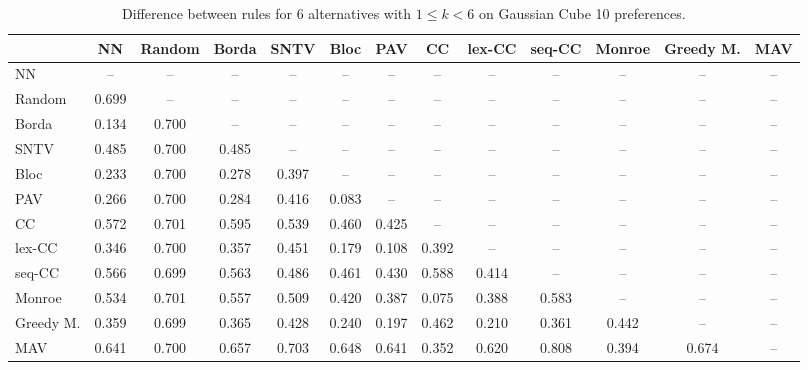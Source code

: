 
\begin{table*}[h!]
\centering
\begin{tabular}{lcccccccccccc}
\toprule
 & NN & Random & Borda & SNTV & Bloc & PAV & CC & lex-CC & seq-CC & Monroe & Greedy M. & MAV \\
\midrule
NN & -- & -- & -- & -- & -- & -- & -- & -- & -- & -- & -- & -- \\
Random & 0.699 & -- & -- & -- & -- & -- & -- & -- & -- & -- & -- & -- \\
Borda & 0.134 & 0.700 & -- & -- & -- & -- & -- & -- & -- & -- & -- & -- \\
SNTV & 0.485 & 0.700 & 0.485 & -- & -- & -- & -- & -- & -- & -- & -- & -- \\
Bloc & 0.233 & 0.700 & 0.278 & 0.397 & -- & -- & -- & -- & -- & -- & -- & -- \\
PAV & 0.266 & 0.700 & 0.284 & 0.416 & 0.083 & -- & -- & -- & -- & -- & -- & -- \\
CC & 0.572 & 0.701 & 0.595 & 0.539 & 0.460 & 0.425 & -- & -- & -- & -- & -- & -- \\
lex-CC & 0.346 & 0.700 & 0.357 & 0.451 & 0.179 & 0.108 & 0.392 & -- & -- & -- & -- & -- \\
seq-CC & 0.566 & 0.699 & 0.563 & 0.486 & 0.461 & 0.430 & 0.588 & 0.414 & -- & -- & -- & -- \\
Monroe & 0.534 & 0.701 & 0.557 & 0.509 & 0.420 & 0.387 & 0.075 & 0.388 & 0.583 & -- & -- & -- \\
Greedy M. & 0.359 & 0.699 & 0.365 & 0.428 & 0.240 & 0.197 & 0.462 & 0.210 & 0.361 & 0.442 & -- & -- \\
MAV & 0.641 & 0.700 & 0.657 & 0.703 & 0.648 & 0.641 & 0.352 & 0.620 & 0.808 & 0.394 & 0.674 & -- \\
\bottomrule
\end{tabular}

\caption{Difference between rules for 6 alternatives with $1 \leq k < 6$ on Gaussian Cube 10 preferences.}
\end{table*}
